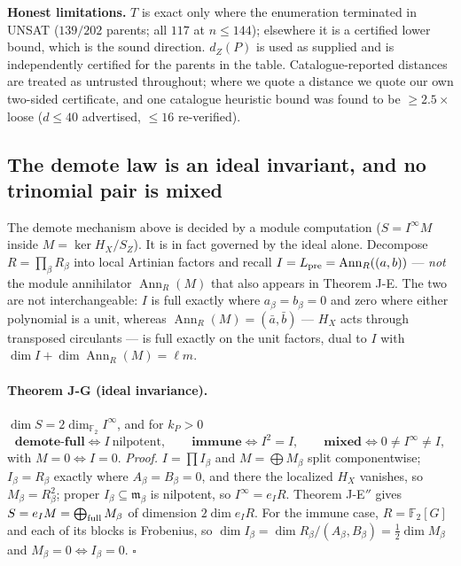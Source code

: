 \documentclass[11pt]{article}
\theoremstyle{plain}
\theoremstyle{remark}
\begin{document}
\textbf{Honest limitations.} $T$ is exact only where the enumeration terminated in UNSAT
($139/202$ parents; all $117$ at $n\le 144$); elsewhere it is a certified lower bound, which is the sound
direction. $d_Z(P)$ is used as supplied and is independently certified for the parents
in the table. Catalogue-reported distances are treated as untrusted throughout; where we
quote a distance we quote our own two-sided certificate, and one catalogue heuristic
bound was found to be $\ge 2.5\times$ loose ($d\le 40$ advertised, $\le 16$ re-verified).

\subsection{The demote law is an ideal invariant, and no trinomial pair is
mixed}\label{sec:idealinvariant}

The demote mechanism above is decided by a module computation
($S=I^\infty M$ inside $M=\ker H_X/S_Z$). It is in fact governed by the ideal
alone. Decompose $R=\prod_\beta R_\beta$ into local Artinian factors and recall
$I=L_{\rm pre}=\operatorname{Ann}_R((a,b))$ --- \emph{not} the module
annihilator $\operatorname{Ann}_R(M)$ that also appears in Theorem J-E. The two
are not interchangeable: $I$ is full exactly where $a_\beta=b_\beta=0$ and zero
where either polynomial is a unit, whereas $\operatorname{Ann}_R(M)=(\bar
a,\bar b)$ --- $H_X$ acts through transposed circulants --- is full exactly on
the unit factors, dual to $I$ with
$\dim I+\dim\operatorname{Ann}_R(M)=\ell m$.

\paragraph{Theorem J-G (ideal invariance).}
$\dim S=2\dim_{\mathbb F_2}I^\infty$, and for $k_P>0$
\[
\textbf{demote-full}\iff I\ \text{nilpotent},\qquad
\textbf{immune}\iff I^2=I,\qquad
\textbf{mixed}\iff 0\neq I^\infty\neq I,
\]
with $M=0\iff I=0$. \emph{Proof.} $I=\prod I_\beta$ and $M=\bigoplus M_\beta$
split componentwise; $I_\beta=R_\beta$ exactly where $A_\beta=B_\beta=0$, and
there the localized $H_X$ vanishes, so $M_\beta=R_\beta^2$; proper
$I_\beta\subseteq\mathfrak m_\beta$ is nilpotent, so $I^\infty=e_IR$. Theorem
J-E${}''$ gives $S=e_IM=\bigoplus_{\rm full}M_\beta$ of dimension
$2\dim e_IR$. For the immune case, $R=\mathbb F_2[G]$ and each of its blocks is
Frobenius, so
$\dim I_\beta=\dim R_\beta/(A_\beta,B_\beta)=\tfrac12\dim M_\beta$ and
$M_\beta=0\iff I_\beta=0$. $\square$
\end{document}
